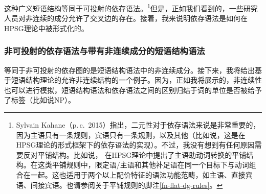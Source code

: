 这种广义短语结构等同于可投射的依存语法。\footnote{\label{fn-dg-binary-branching}%
Sylvain Kahane（p.\,c.\, 2015）指出，二元性对于依存语法来说是非常重要的，因为主语只有一条规则，宾语只有一条规则，以及其他（比如说\citealp{Kahane2009a}，这是在HPSG理论的形式框架下的依存语法的实现）。不过，我没有想到有任何原因需要反对平铺结构。比如说， \citet[]{GSag2000a-u}在HPSG理论中提出了主语助动词转换的平铺结构。在这类平铺规则中，限定语/主语和其他补足语在同一个目标下与动词组合在一起。这也适用于两个以上配价特征的语法功能范畴，如主语、直接宾语、间接宾语。也请参阅关于平铺规则的脚注\ref{fn-flat-dg-rules}。
}但是，正如我们看到的，一些研究人员对非连续的成分允许了交叉边的存在。接着，我来说明依存语法是如何在HPSG理论中被形式化的。

\subsubsection{非可投射的依存语法与带有非连续成分的短语结构语法}
\label{sec-discontinuous-constituents-HPSG}

等同于非可投射的依存图的是短语结构语法中的非连续成分。接下来，我将给出基于短语结构理论的允许非连续结构的一个例子。因为，正如我将展示的，非连续性也可以进行模拟，短语结构语法和依存语法之间的区别归结于词的单位是否被给予了标签（比如说NP）。

